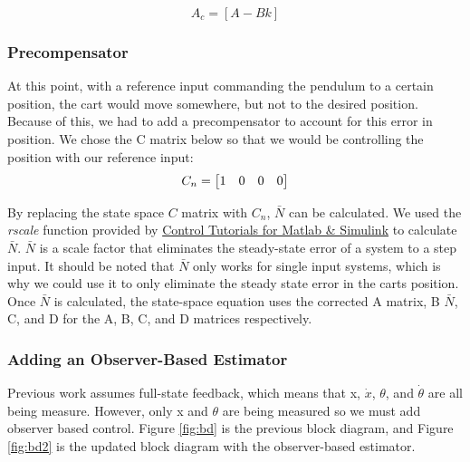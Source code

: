 \documentclass{article}
\begin{document}
\begin{equation}
\label{ac}
A_c=[A-Bk]
\end{equation}

\subsubsection{Precompensator}
At this point, with a reference input commanding the pendulum to a certain position, the cart would move somewhere, but not to the desired position. Because of this, we had to add a precompensator to account for this error in position. We chose the C matrix below so that we would be controlling the position with our reference input:
\\

\begin{equation}
\label{pcomp}
\centering
C_n = \begin{bmatrix}
1 & 0 & 0 & 0
\end{bmatrix}
\end{equation}
 
By replacing the state space $C$ matrix with $C_n$, $\bar{N}$ can be calculated. We used the \textit{rscale} function provided by \href{http://ctms.engin.umich.edu/CTMS/index.php?aux=Extras_rscale}{Control Tutorials for Matlab \& Simulink} to calculate $\bar{N}$. $\bar{N}$ is a scale factor that eliminates the steady-state error of a system to a step input. It should be noted that $\bar{N}$ only works for single input systems, which is why we could use it to only eliminate the steady state error in the carts position. Once $\bar{N}$ is calculated, the state-space equation uses the corrected A matrix, B $\bar{N}$, C, and D for the A, B, C, and D matrices respectively.
 
 \subsubsection{Adding an Observer-Based Estimator}
 Previous work assumes full-state feedback, which means that x, $\dot{x}$, $\theta$, and $\dot{\theta}$ are all being measure. However, only x and $\theta$ are being measured so we must add observer based control. Figure \ref{fig:bd} is the previous block diagram, and Figure \ref{fig:bd2} is the updated block diagram with the observer-based estimator.
\end{document}

